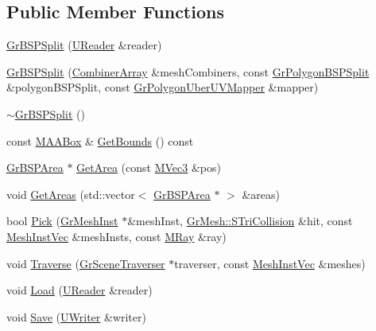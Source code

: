 \subsection*{Public Member Functions}
\begin{CompactItemize}
\item 
\hyperlink{class_gr_b_s_p_split_40e7d5a265ecb02482fed589590c9e9f}{GrBSPSplit} (\hyperlink{class_u_reader}{UReader} \&reader)
\item 
\hyperlink{class_gr_b_s_p_split_dfb634909406abfbadc2a5af029d7e1f}{GrBSPSplit} (\hyperlink{class_gr_b_s_p_split_c43b3da58545a4586d6a7a451f5935af}{CombinerArray} \&meshCombiners, const \hyperlink{class_gr_polygon_b_s_p_split}{GrPolygonBSPSplit} \&polygonBSPSplit, const \hyperlink{class_gr_polygon_uber_u_v_mapper}{GrPolygonUberUVMapper} \&mapper)
\item 
\hyperlink{class_gr_b_s_p_split_9bafe80ce7b2b9f769c3cfa81cb6ae74}{$\sim$GrBSPSplit} ()
\item 
const \hyperlink{class_m_a_a_box}{MAABox} \& \hyperlink{class_gr_b_s_p_split_d350a8e48025fdad328728bd7fdd4e59}{GetBounds} () const 
\item 
\hyperlink{class_gr_b_s_p_area}{GrBSPArea} $\ast$ \hyperlink{class_gr_b_s_p_split_3340c0f7673b0861c89f8b434b97271c}{GetArea} (const \hyperlink{class_m_vec3}{MVec3} \&pos)
\item 
void \hyperlink{class_gr_b_s_p_split_6bbc3680f991d069a2e7da4d1d5ae939}{GetAreas} (std::vector$<$ \hyperlink{class_gr_b_s_p_area}{GrBSPArea} $\ast$ $>$ \&areas)
\item 
bool \hyperlink{class_gr_b_s_p_split_0563f3ee8c06239078f320d1bab3c6f3}{Pick} (\hyperlink{class_gr_mesh_inst}{GrMeshInst} $\ast$\&meshInst, \hyperlink{struct_gr_mesh_1_1_s_tri_collision}{GrMesh::STriCollision} \&hit, const \hyperlink{class_gr_b_s_p_split_0d83e2da4ca339cbb2bb2060b2bec99b}{MeshInstVec} \&meshInsts, const \hyperlink{class_m_ray}{MRay} \&ray)
\item 
void \hyperlink{class_gr_b_s_p_split_dad2ea9500a1bedb5736e6d248f3d802}{Traverse} (\hyperlink{class_gr_scene_traverser}{GrSceneTraverser} $\ast$traverser, const \hyperlink{class_gr_b_s_p_split_0d83e2da4ca339cbb2bb2060b2bec99b}{MeshInstVec} \&meshes)
\item 
void \hyperlink{class_gr_b_s_p_split_126cdb20e5d6df4c722c1f6277364e89}{Load} (\hyperlink{class_u_reader}{UReader} \&reader)
\item 
void \hyperlink{class_gr_b_s_p_split_01c7a29e9a6a511fea57ee9e4bf53496}{Save} (\hyperlink{class_u_writer}{UWriter} \&writer)
\end{CompactItemize}


